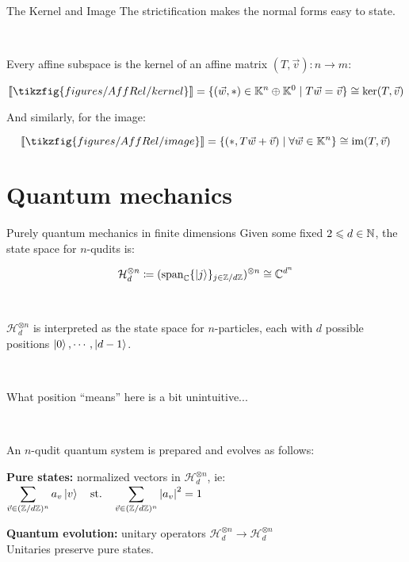 \documentclass{beamer}
\begin{document}
\begin{frame}{The Kernel and Image}
The strictification makes the normal forms easy to state.

\

Every affine subspace is the kernel of an affine matrix \((T,\vec v):n\to m\):

\[\interp{\tikzfig{figures/AffRel/kernel}}=\{(\vec w,*) \in \K^n\oplus \K^0 \mid T\vec w = \vec v\}\cong \ker (T,\vec v) \]

And similarly, for the image:

\[\interp{\tikzfig{figures/AffRel/image}}=\{(*,T\vec w + \vec v) \mid \forall \vec w \in \K^n \}\cong\im (T,\vec v) \]

\end{frame}

\section{Quantum mechanics}

\begin{frame}{Purely quantum mechanics in finite dimensions}
Given some fixed \(2\leqslant d \in\mathbb{N}\), the state space for \(n\)-qudits is:

\[\mathcal{H}_d^{\otimes n}\coloneqq (\operatorname{span}_{\mathbb{C}}\{ |j\rangle\}_{j \in \mathbb{Z}/d\mathbb{Z}})^{\otimes n}\cong \mathbb{C}^{d^n} \]

\

\(\mathcal{H}_d^{\otimes n}\) is interpreted as the state space for \(n\)-particles, each with \(d\) possible positions \(\ket{0}, \cdots, \ket{d-1}\). 

\

What position ``means'' here is a bit unintuitive...

\

An \(n\)-qudit quantum system is prepared and evolves as follows:
\begin{description}
\item \textbf{Pure states:} normalized vectors in \(\mathcal{H}_d^{\otimes n}\), ie:\\
\(\displaystyle\sum_{\vec v\in (\mathbb{Z}/d\mathbb{Z})^n } a_{v}  \ket{v}\quad\text{st.}\quad\sum_{\vec v\in (\mathbb{Z}/d\mathbb{Z})^n } \abs{a_{v}}^2 =1 \)


\item \textbf{Quantum evolution:} unitary operators \(\mathcal{H}_d^{\otimes n}\to \mathcal{H}_d^{\otimes n}\)\\

Unitaries preserve pure states.
\end{description}

\end{frame}
\end{document}
